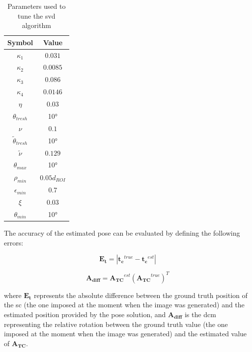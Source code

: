 \begin{table}[htbp]
  \centering
  \begin{tabular}{cc}
    \hline
    \hline
    Symbol                   & Value          \\
    \hline
    $\kappa_1$               & $0.031$        \\
    \hline
    $\kappa_2$               & $0.0085$       \\
    \hline
    $\kappa_3$               & $0.086$        \\
    \hline
    $\kappa_4$               & $0.0146$       \\
    \hline
    $\eta$                   & $0.03$         \\
    \hline
    $\theta_{tresh}$         & \ang{10}       \\
    \hline
    $\nu$                    & $0.1$          \\
    \hline
    $\tilde{\theta}_{tresh}$ & \ang{10}       \\
    \hline
    $\tilde{\nu}$            & $0.129$        \\
    \hline
    $\theta_{max}$           & \ang{10}       \\
    \hline
    $\rho_{min}$             & $0.05 d_{ROI}$ \\
    \hline
    $\epsilon_{min}$         & 0.7            \\
    \hline
    $\xi$                    & $0.03$         \\
    \hline
    $\theta_{min}$           & \ang{10}       \\
    \hline
    \hline
  \end{tabular}
  \caption{Parameters used to tune the \acrshort{svd} algorithm}
  \label{tab:svdParameters}
\end{table}

The accuracy of the estimated pose can be evaluated by defining the following errors:

\begin{equation}
  \mathbf{E_t} = |\mathbf{t_c}^{true} - \mathbf{t_c}^{est}|
\end{equation}

\begin{equation}
  \mathbf{A_{diff}} = \mathbf{A_{TC}}^{est}(\mathbf{A_{TC}}^{true})^T
\end{equation}

where $\mathbf{E_t}$ represents the absolute difference between the ground truth position of the \acrshort{sc} (the one imposed at the moment when the image was generated) and the estimated position provided by the pose solution, and $\mathbf{A_{diff}}$ is the \acrshort{dcm} representing the relative rotation between the ground truth value (the one imposed at the moment when the image was generated) and the estimated value of $\mathbf{A_{TC}}$.

